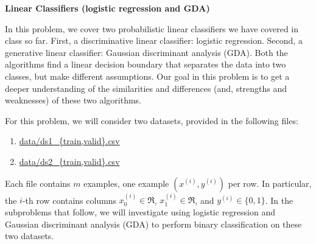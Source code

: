 \clearpage
\item {} {\bf Linear Classifiers (logistic regression and GDA)}

In this problem, we cover two probabilistic linear classifiers we have
covered in class so far. First, a discriminative linear classifier: logistic
regression. Second, a generative linear classifier: Gaussian discriminant
analysis (GDA). Both the algorithms find a linear decision boundary that
separates the data into two classes, but make different assumptions. Our goal
in this problem is to get a deeper understanding of the similarities and
differences (and, strengths and weaknesses) of these two algorithms.

For this problem, we will consider two datasets, provided in the following
files:
\begin{enumerate}[label=\roman*.]
	\item \url{data/ds1_{train,valid}.csv}
	\item \url{data/ds2_{train,valid}.csv}
\end{enumerate}
Each file contains $m$ examples, one example $(x^{(i)}, y^{(i)})$ per row.
In particular, the $i$-th row contains columns $x^{(i)}_0\in\Re$,
$x^{(i)}_1\in\Re$, and $y^{(i)}\in\{0, 1\}$. In the subproblems that follow, we
will investigate using logistic regression and Gaussian discriminant analysis
(GDA) to perform binary classification on these two datasets.

\begin{enumerate}
	
	
	
	
	
	
	
	
\end{enumerate}
